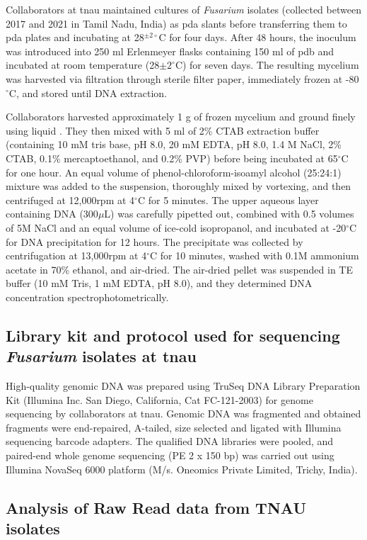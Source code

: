 Collaborators at \ac{tnau} maintained cultures of \textit{Fusarium} isolates (collected between 2017 and 2021 in Tamil Nadu, India) as \acf{pda} slants before transferring them to \acf{pda} plates and incubating at 28$^{\pm 2\circ}$C for four days. After 48 hours, the inoculum was introduced into 250 ml Erlenmeyer flasks containing 150 ml of \ac{pdb} and incubated at room temperature (28${\pm 2^\circ}$C) for seven days. The resulting mycelium was harvested via filtration through sterile filter paper, immediately frozen at -80$^\circ$C, and stored until DNA extraction. 

Collaborators harvested approximately 1 g of frozen mycelium and  ground finely using liquid . They then mixed with 5 ml of 2\% CTAB extraction buffer (containing 10 mM tris base, pH 8.0, 20 mM EDTA, pH 8.0, 1.4 M NaCl, 2\% CTAB, 0.1\% mercaptoethanol, and 0.2\% PVP) before being incubated at 65$^\circ$C for one hour. An equal volume of phenol-chloroform-isoamyl alcohol (25:24:1) mixture was added to the suspension, thoroughly mixed by vortexing, and then centrifuged at 12,000rpm at 4$^\circ$C for 5 minutes. The upper aqueous layer containing DNA (300\(\mu\)L) was carefully pipetted out, combined with 0.5 volumes of 5M NaCl and an equal volume of ice-cold isopropanol, and incubated at -20$^\circ$C for DNA precipitation for 12 hours. The precipitate was collected by centrifugation at 13,000rpm at 4$^\circ$C for 10 minutes, washed with 0.1M ammonium acetate in 70\% ethanol, and air-dried. The air-dried pellet was suspended in TE buffer (10 mM Tris, 1 mM EDTA, pH 8.0), and they determined DNA concentration spectrophotometrically.

\subsection{Library kit and protocol used for sequencing \textit{Fusarium} isolates at \ac{tnau}}

High-quality genomic DNA was prepared using TruSeq DNA Library Preparation Kit (Illumina Inc. San Diego, California, Cat FC-121-2003) for genome sequencing by collaborators at \ac{tnau}. Genomic DNA was fragmented and obtained fragments were end-repaired, A-tailed, size selected and ligated with Illumina sequencing barcode adapters. The qualified DNA libraries were pooled, and paired-end whole genome sequencing (PE 2 x 150 bp) was carried out using Illumina NovaSeq 6000 platform (M/s. Oneomics Private Limited, Trichy, India). 

\subsection{Analysis of Raw Read data from TNAU isolates}

